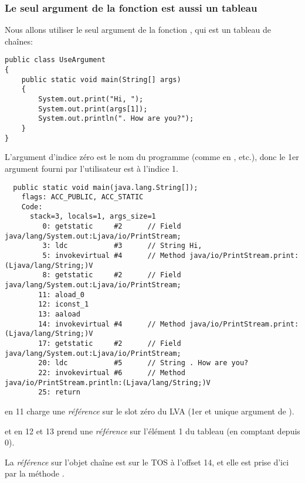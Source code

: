 \subsubsection{Le seul argument de la fonction \main est aussi un tableau}

Nous allons utiliser le seul argument de la fonction \main, qui est un tableau de
chaînes:

\begin{lstlisting}[style=customjava]
public class UseArgument
{
	public static void main(String[] args)
	{
		System.out.print("Hi, ");
		System.out.print(args[1]);
		System.out.println(". How are you?");
	}
}
\end{lstlisting}

L'argument d'indice zéro est le nom du programme (comme en \CCpp, etc.), donc le
1er argument fourni par l'utilisateur est à l'indice 1.

\begin{lstlisting}
  public static void main(java.lang.String[]);
    flags: ACC_PUBLIC, ACC_STATIC
    Code:
      stack=3, locals=1, args_size=1
         0: getstatic     #2      // Field java/lang/System.out:Ljava/io/PrintStream;
         3: ldc           #3      // String Hi, 
         5: invokevirtual #4      // Method java/io/PrintStream.print:(Ljava/lang/String;)V
         8: getstatic     #2      // Field java/lang/System.out:Ljava/io/PrintStream;
        11: aload_0       
        12: iconst_1      
        13: aaload        
        14: invokevirtual #4      // Method java/io/PrintStream.print:(Ljava/lang/String;)V
        17: getstatic     #2      // Field java/lang/System.out:Ljava/io/PrintStream;
        20: ldc           #5      // String . How are you?
        22: invokevirtual #6      // Method java/io/PrintStream.println:(Ljava/lang/String;)V
        25: return        
\end{lstlisting}

 en 11 charge une \emph{référence} sur le slot zéro du \ac{LVA}
(1er et unique argument de \main).

 et  en 12 et 13 prend une \emph{référence} sur l'élément
1 du tableau (en comptant depuis 0).

La \emph{référence} sur l'objet chaîne est sur le \ac{TOS} à l'offset 14, et elle
est prise d'ici par la méthode .

